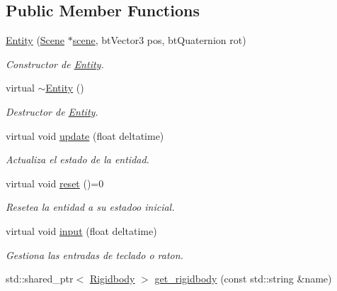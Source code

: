 \subsection*{Public Member Functions}
\begin{DoxyCompactItemize}
\item 
\mbox{\hyperlink{classexample_1_1_entity_a575ee03bfa88ad4905f3e8221648f8bf}{Entity}} (\mbox{\hyperlink{classexample_1_1_scene}{Scene}} $\ast$\mbox{\hyperlink{classexample_1_1_entity_ab851dbde4a16829f9fb77ab9a66b9f1e}{scene}}, bt\+Vector3 pos, bt\+Quaternion rot)
\begin{DoxyCompactList}\small\item\em Constructor de \mbox{\hyperlink{classexample_1_1_entity}{Entity}}. \end{DoxyCompactList}\item 
virtual \mbox{\hyperlink{classexample_1_1_entity_a7ad532833fe996de3a728570b70a2c1d}{$\sim$\+Entity}} ()
\begin{DoxyCompactList}\small\item\em Destructor de \mbox{\hyperlink{classexample_1_1_entity}{Entity}}. \end{DoxyCompactList}\item 
virtual void \mbox{\hyperlink{classexample_1_1_entity_a1f987399c6c2f5e83b2d245d81cc3b7e}{update}} (float deltatime)
\begin{DoxyCompactList}\small\item\em Actualiza el estado de la entidad. \end{DoxyCompactList}\item 
virtual void \mbox{\hyperlink{classexample_1_1_entity_a38eec21167e85013a5e89a9131458bfa}{reset}} ()=0
\begin{DoxyCompactList}\small\item\em Resetea la entidad a su estadoo inicial. \end{DoxyCompactList}\item 
virtual void \mbox{\hyperlink{classexample_1_1_entity_a8e2ffc6208151f9d60b7c98d04f12de2}{input}} (float deltatime)
\begin{DoxyCompactList}\small\item\em Gestiona las entradas de teclado o raton. \end{DoxyCompactList}\item 
std\+::shared\+\_\+ptr$<$ \mbox{\hyperlink{classexample_1_1_rigidbody}{Rigidbody}} $>$ \mbox{\hyperlink{classexample_1_1_entity_a032f94ab3e0654a11c83dc6ddb650e5c}{get\+\_\+rigidbody}} (const std\+::string \&name)

\end{DoxyCompactItemize}
